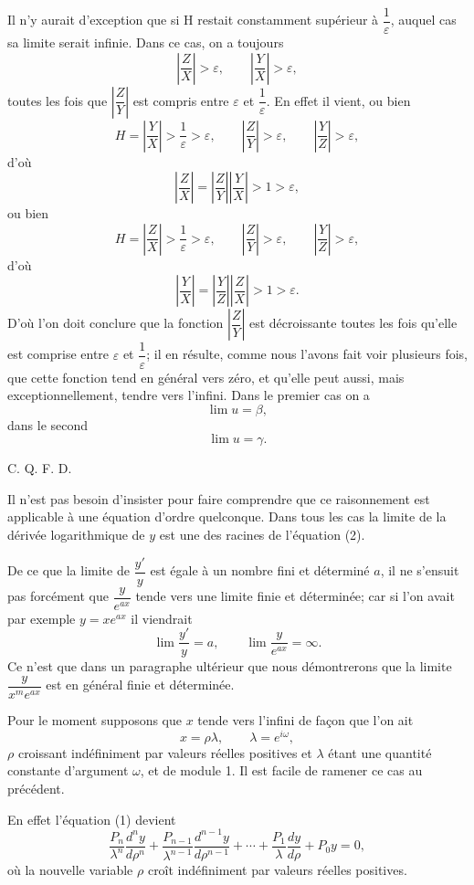 \documentclass[11pt]{article}
\begin{document}
Il n'y aurait d'exception que si H restait constamment supérieur à $\dfrac1\varepsilon$, auquel cas sa limite serait infinie. Dans ce cas, on a toujours
\[
\left|\frac{Z}{X}\right|>\varepsilon,
\qquad
\left|\frac{Y}{X}\right|>\varepsilon,
\]
toutes les fois que $\left|\dfrac{Z}{Y}\right|$ est compris entre $\varepsilon$ et $\dfrac1\varepsilon$. En effet il vient, ou bien
\[
H=\left|\frac{Y}{X}\right|>\frac1\varepsilon>\varepsilon,
\qquad
\left|\frac{Z}{Y}\right|>\varepsilon,
\qquad
\left|\frac{Y}{Z}\right|>\varepsilon,
\]
d'où
\[
\left|\frac{Z}{X}\right|=\left|\frac{Z}{Y}\right|\left|\frac{Y}{X}\right|>1>\varepsilon,
\]
ou bien
\[
H=\left|\frac{Z}{X}\right|>\frac1\varepsilon>\varepsilon,
\qquad
\left|\frac{Z}{Y}\right|>\varepsilon,
\qquad
\left|\frac{Y}{Z}\right|>\varepsilon,
\]
d'où
\[
\left|\frac{Y}{X}\right|=\left|\frac{Y}{Z}\right|\left|\frac{Z}{X}\right|>1>\varepsilon.
\]
D'où l'on doit conclure que la fonction $\left|\dfrac{Z}{Y}\right|$ est décroissante toutes les fois qu'elle est comprise entre $\varepsilon$ et $\dfrac1\varepsilon$; il en résulte, comme nous l'avons fait voir plusieurs fois, que cette fonction tend en général vers zéro, et qu'elle peut aussi, mais exceptionnellement, tendre vers l'infini. Dans le premier cas on a
\[
\lim u=\beta,
\]
dans le second
\[
\lim u=\gamma.
\]
\begin{flushright}C. Q. F. D.\end{flushright}

Il n'est pas besoin d'insister pour faire comprendre que ce raisonnement est applicable à une équation d'ordre quelconque. Dans tous les cas la limite de la dérivée logarithmique de $y$ est une des racines de l'équation (2).

De ce que la limite de $\dfrac{y'}{y}$ est égale à un nombre fini et déterminé $a$, il ne s'ensuit pas forcément que $\dfrac{y}{e^{ax}}$ tende vers une limite finie et déterminée; car si l'on avait par exemple $y=xe^{ax}$ il viendrait
\[
\lim\frac{y'}{y}=a,
\qquad
\lim\frac{y}{e^{ax}}=\infty.
\]
Ce n'est que dans un paragraphe ultérieur que nous démontrerons que la limite $\dfrac{y}{x^m e^{ax}}$ est en général finie et déterminée.

Pour le moment supposons que $x$ tende vers l'infini de façon que l'on ait
\[
x=\rho\lambda,
\qquad
\lambda=e^{i\omega},
\]
$\rho$ croissant indéfiniment par valeurs réelles positives et $\lambda$ étant une quantité constante d'argument $\omega$, et de module 1. Il est facile de ramener ce cas au précédent.

En effet l'équation (1) devient
\[
\tag{1\,bis}
\frac{P_n}{\lambda^n}\frac{d^ny}{d\rho^n}+\frac{P_{n-1}}{\lambda^{n-1}}\frac{d^{n-1}y}{d\rho^{n-1}}+\cdots+\frac{P_1}{\lambda}\frac{dy}{d\rho}+P_0y=0,
\]
où la nouvelle variable $\rho$ croît indéfiniment par valeurs réelles positives.
\end{document}
